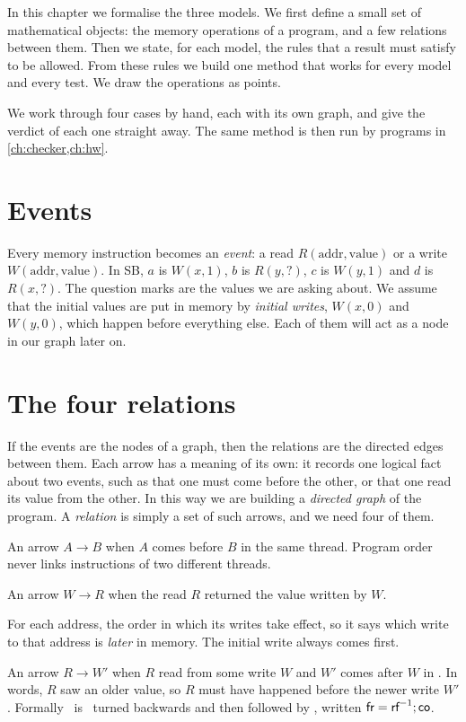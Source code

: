 \noindent In this chapter we formalise the three models. We first define a small set of mathematical objects: the memory operations of a program, and a few relations between them. Then we state, for each model, the rules that a result must satisfy to be allowed. From these rules we build one method that works for every model and every test. We draw the operations as points.

\noindent We work through four cases by hand, each with its own graph, and give the verdict of each one straight away. The same method is then run by programs in \cref{ch:checker,ch:hw}.

\section{Events}
\label{sec:events}

Every memory instruction becomes an \emph{event}: a read $R(\text{addr}, \text{value})$ or a write $W(\text{addr}, \text{value})$. In SB, $a$ is $W(x,1)$, $b$ is $R(y,?)$, $c$ is $W(y,1)$ and $d$ is $R(x,?)$. The question marks are the values we are asking about. We assume that the initial values are put in memory by \emph{initial writes}, $W(x,0)$ and $W(y,0)$, which happen before everything else. Each of them will act as a node in our graph later on.

\section{The four relations}
\label{sec:relations}

If the events are the nodes of a graph, then the relations are the directed edges between them. Each arrow has a meaning of its own: it records one logical fact about two events, such as that one must come before the other, or that one read its value from the other. In this way we are building a \emph{directed graph} of the program. A \emph{relation} is simply a set of such arrows, and we need four of them.

\begin{description}[leftmargin=0.9cm, style=nextline]
\item[\po\ \normalfont(program order)] An arrow $A \to B$ when $A$ comes before $B$ in the same thread. Program order never links instructions of two different threads.
\item[\rf\ \normalfont(reads-from)] An arrow $W \to R$ when the read $R$ returned the value written by $W$.
\item[\co\ \normalfont(coherence order)] For each address, the order in which its writes take effect, so it says which write to that address is \emph{later} in memory. The initial write always comes first.
\item[\fr\ \normalfont(from-read)] An arrow $R \to W'$ when $R$ read from some write $W$ and $W'$ comes after $W$ in \co. In words, $R$ saw an older value, so $R$ must have happened before the newer write $W'$. Formally \fr\ is \rf\ turned backwards and then followed by \co, written $\textsf{fr} = \textsf{rf}^{-1};\textsf{co}$.
\end{description}

